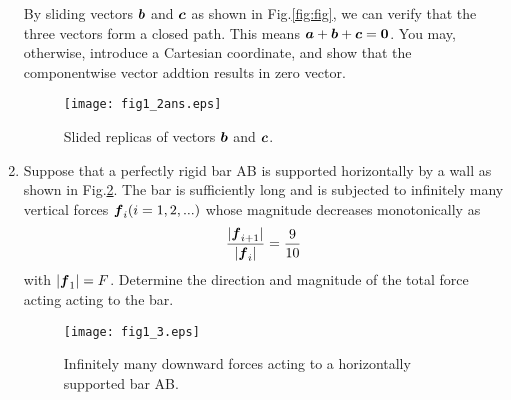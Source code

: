 \documentclass[10pt,a4j]{article}
\begin{document}
\begin{enumerate}
    {\small
        By sliding vectors $\mbox{\boldmath $b$}$ and $\mbox{\boldmath $c$}$ as shown in Fig.\ref{fig:fig}, we can verify that the three vectors form a closed path. This means $\mbox{\boldmath $a$}+\mbox{\boldmath $b$}+\mbox{\boldmath $c$}=\mbox{\boldmath $0$}$. You may, otherwise, introduce a Cartesian coordinate, and show that the componentwise vector addtion results in zero vector. 
    }
    \begin{figure}[h]
        \begin{center}
        \texttt{[image: fig1\_2ans.eps]} 
        \end{center}
        \caption{Slided replicas of vectors $\mbox{\boldmath $b$}$ and $\mbox{\boldmath $c$}$.} 
        \label{fig:fig1_2ans}
    \end{figure}
\item
    Suppose that a perfectly rigid bar AB is supported horizontally by a wall as shown in Fig.\ref{fig:fig1_3}. The bar is sufficiently long and is subjected to infinitely many vertical forces $\mbox{\boldmath $f$}_i (i=1,2,...)$ whose magnitude decreases monotonically as 
    \[
         \frac{ |\mbox{\boldmath $f$}_{i+1}| }{ |\mbox{\boldmath $f$}_i| } =\frac{9}{10} 
    \]
with $|\mbox{\boldmath $f$}_1|=F$. Determine the direction and magnitude of the total force acting acting to the bar.\\
\begin{figure}[h]
    \begin{center}
    \texttt{[image: fig1\_3.eps]} 
    \end{center}
    \caption{Infinitely many downward forces acting to a horizontally supported bar AB.}
    \label{fig:fig1_3}
\end{figure}


\end{enumerate}
\end{document}
